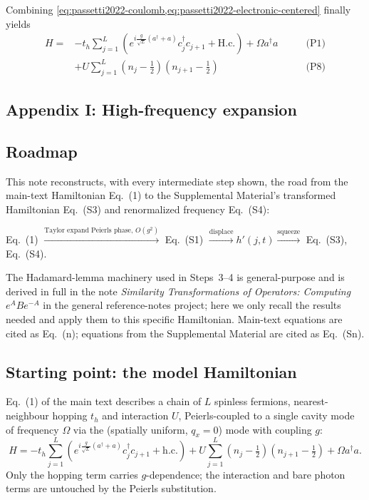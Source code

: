 \documentclass[../../main.tex]{subfiles}
\begin{document}
Combining \cref{eq:passetti2022-coulomb,eq:passetti2022-electronic-centered} finally yields
\begin{equation}
\begin{aligned}
H=&-t_h\sum_{j=1}^{L}\left(
e^{i\frac{g}{\sqrt L}(a^\dagger+a)}c_j^\dagger c_{j+1}
+\mathrm{H.c.}\right)+\Omega a^\dagger a &\qquad\text{(P1)}\\
&+U\sum_{j=1}^{L}\left(n_j-\frac12\right)
\left(n_{j+1}-\frac12\right)
&\qquad\text{(P8)}
\end{aligned}
\label{eq:passetti2022-derived-model}
\end{equation}


\subsection{Appendix I: High-frequency expansion} 
\label{subsec:passetti2022-high-frequency}

\subsection*{Roadmap}
This note reconstructs, with every intermediate step shown, the road from the
main-text Hamiltonian Eq.~(1) to the Supplemental Material's transformed
Hamiltonian Eq.~(S3) and renormalized frequency Eq.~(S4):
\begin{center}
Eq.~(1) $\xrightarrow{\text{Taylor expand Peierls phase, }O(g^2)}$ Eq.~(S1)
$\xrightarrow{\text{displace}} h'(j,t)
\xrightarrow{\text{squeeze}}$ Eq.~(S3), Eq.~(S4).
\end{center}
The Hadamard-lemma machinery used in Steps~3--4 is general-purpose and is
derived in full in the note \emph{Similarity Transformations of Operators:
Computing $e^{A}Be^{-A}$} in the general reference-notes project; here we only
recall the results needed and apply them to this specific Hamiltonian. Main-text equations are cited as Eq.~(n); equations
from the Supplemental Material are cited as Eq.~(Sn).

\subsection*{Starting point: the model Hamiltonian}

Eq.~(1) of the main text describes a chain of $L$ spinless fermions,
nearest-neighbour hopping $t_h$ and interaction $U$, Peierls-coupled to a
single cavity mode of frequency $\Omega$ via the (spatially uniform, $q_x=0$)
mode with coupling $g$:
\begin{equation}
H=-t_h\sum_{j=1}^{L}\left(e^{i\frac{g}{\sqrt L}(a^\dagger+a)}c_j^\dagger c_{j+1}
+\mathrm{h.c.}\right)
+U\sum_{j=1}^{L}\left(n_j-\tfrac12\right)\left(n_{j+1}-\tfrac12\right)
+\Omega a^\dagger a. \label{eq:maintext1}
\end{equation}
Only the hopping term carries $g$-dependence; the interaction and bare photon
terms are untouched by the Peierls substitution.
\end{document}
